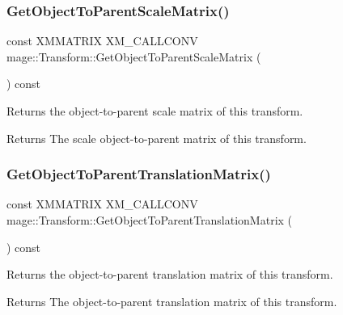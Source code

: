 \subsubsection{\texorpdfstring{Get\+Object\+To\+Parent\+Scale\+Matrix()}{GetObjectToParentScaleMatrix()}}
{\footnotesize\ttfamily const X\+M\+M\+A\+T\+R\+IX X\+M\+\_\+\+C\+A\+L\+L\+C\+O\+NV mage\+::\+Transform\+::\+Get\+Object\+To\+Parent\+Scale\+Matrix (\begin{DoxyParamCaption}{ }\end{DoxyParamCaption}) const\hspace{0.3cm}{\ttfamily [noexcept]}}

Returns the object-\/to-\/parent scale matrix of this transform.

\begin{DoxyReturn}{Returns}
The scale object-\/to-\/parent matrix of this transform. 
\end{DoxyReturn}
\mbox{\label{classmage_1_1_transform_adfecbcf77681da90a0d22690621936b3}} 
\subsubsection{\texorpdfstring{Get\+Object\+To\+Parent\+Translation\+Matrix()}{GetObjectToParentTranslationMatrix()}}
{\footnotesize\ttfamily const X\+M\+M\+A\+T\+R\+IX X\+M\+\_\+\+C\+A\+L\+L\+C\+O\+NV mage\+::\+Transform\+::\+Get\+Object\+To\+Parent\+Translation\+Matrix (\begin{DoxyParamCaption}{ }\end{DoxyParamCaption}) const\hspace{0.3cm}{\ttfamily [noexcept]}}

Returns the object-\/to-\/parent translation matrix of this transform.

\begin{DoxyReturn}{Returns}
The object-\/to-\/parent translation matrix of this transform. 
\end{DoxyReturn}
\mbox{\label{classmage_1_1_transform_af26e8771a10357032391a0a5f88a56fb}} 
